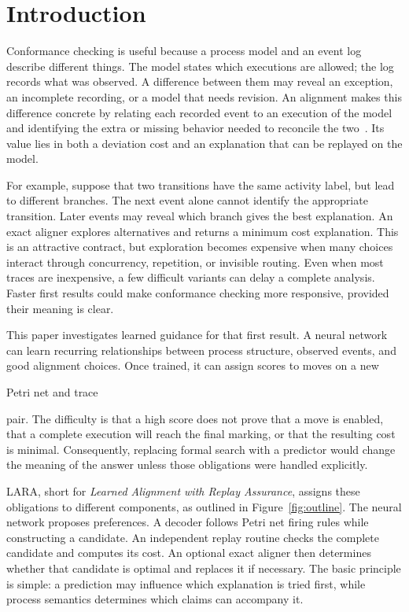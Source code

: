 \section{Introduction}
\label{sec:introduction}

\begin{revised}Conformance checking is useful because a process model and an event log describe different things. The model states which executions are allowed; the log records what was observed. A difference between them may reveal an exception, an incomplete recording, or a model that needs revision. An alignment makes this difference concrete by relating each recorded event to an execution of the model and identifying the extra or missing behavior needed to reconcile the two~\cite{Carmona2018}. Its value lies in both a deviation cost and an explanation that can be replayed on the model.\end{revised}

For example, suppose that two transitions have the same activity label, but lead to different branches. The next event alone cannot identify the appropriate transition. Later events may reveal which branch gives the best explanation. An exact aligner explores alternatives and returns a minimum cost explanation. This is an attractive contract, but exploration becomes expensive when many choices interact through concurrency, repetition, or invisible routing. Even when most traces are inexpensive, a few difficult variants can delay a complete analysis. Faster first results could make conformance checking more responsive, provided their meaning is clear.

This paper investigates learned guidance for that first result. A neural network can learn recurring relationships between process structure, observed events, and good alignment choices. Once trained, it can assign scores to moves on a new \begin{revised}Petri net and trace\end{revised} pair. The difficulty is that a high score does not prove that a move is enabled, that a complete execution will reach the final marking, or that the resulting cost is minimal. Consequently, replacing formal search with a predictor would change the meaning of the answer unless those obligations were handled explicitly.

LARA, short for \emph{Learned Alignment with Replay Assurance}, assigns these obligations to different components, as outlined in Figure~\ref{fig:outline}. The neural network proposes preferences. A decoder follows Petri net firing rules while constructing a candidate. An independent replay routine checks the complete candidate and computes its cost. An optional exact aligner then determines whether that candidate is optimal and replaces it if necessary. The basic principle is simple: a prediction may influence which explanation is tried first, while process semantics determines which claims can accompany it.

